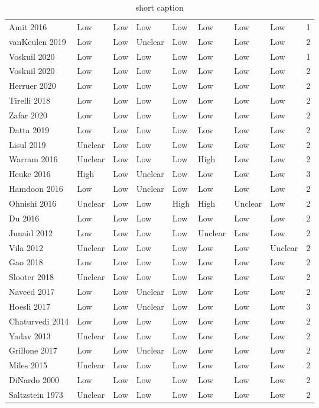 \begin{table}[ht]
\begin{tabular}{lllllllll}
  Amit 2016 & Low & Low & Low & Low & Low & Low & Low & 1 \\ 
  vanKeulen 2019 & Low & Low & Unclear & Low & Low & Low & Low & 2 \\ 
  Voskuil 2020 & Low & Low & Low & Low & Low & Low & Low & 1 \\ 
  Voskuil 2020 & Low & Low & Low & Low & Low & Low & Low & 2 \\ 
  Herruer 2020 & Low & Low & Low & Low & Low & Low & Low & 2 \\ 
  Tirelli 2018 & Low & Low & Low & Low & Low & Low & Low & 2 \\ 
  Zafar 2020 & Low & Low & Low & Low & Low & Low & Low & 2 \\ 
  Datta 2019 & Low & Low & Low & Low & Low & Low & Low & 2 \\ 
  Lisul 2019 & Unclear & Low & Low & Low & Low & Low & Low & 2 \\ 
  Warram 2016 & Unclear & Low & Low & Low & High & Low & Low & 2 \\ 
  Heuke 2016 & High & Low & Unclear & Low & Low & Low & Low & 3 \\ 
  Hamdoon 2016 & Low & Low & Unclear & Low & Low & Low & Low & 2 \\ 
  Ohnishi 2016 & Unclear & Low & Low & High & High & Unclear & Low & 2 \\ 
  Du 2016 & Low & Low & Low & Low & Low & Low & Low & 2 \\ 
  Junaid 2012 & Low & Low & Low & Low & Unclear & Low & Low & 2 \\ 
  Vila 2012 & Unclear & Low & Low & Low & Low & Low & Unclear & 2 \\ 
  Gao 2018 & Low & Low & Low & Low & Low & Low & Low & 2 \\ 
  Slooter 2018 & Unclear & Low & Low & Low & Low & Low & Low & 2 \\ 
  Naveed 2017 & Low & Low & Unclear & Low & Low & Low & Low & 2 \\ 
  Hoesli 2017 & Low & Low & Unclear & Low & Low & Low & Low & 3 \\ 
  Chaturvedi 2014 & Low & Low & Low & Low & Low & Low & Low & 2 \\ 
  Yadav 2013 & Unclear & Low & Low & Low & Low & Low & Low & 2 \\ 
  Grillone 2017 & Low & Low & Unclear & Low & Low & Low & Low & 2 \\ 
  Miles 2015 & Unclear & Low & Low & Low & Low & Low & Low & 2 \\ 
  DiNardo 2000 & Low & Low & Low & Low & Low & Low & Low & 2 \\ 
  Saltzstein 1973 & Unclear & Low & Low & Low & Low & Low & Low & 2 \\ 
   \hline
\end{tabular}
\endgroup
\caption[full caption]{short caption} 
\label{tab:qual_scores}
\end{table}
